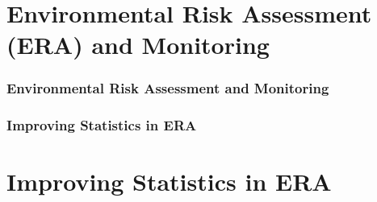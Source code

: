 \documentclass[
	12pt
	]{beamer}
\begin{document}
\section[Environmental Risk Assessment and Environmental Monitoring
]{Environmental Risk Assessment (ERA) and Monitoring}

\begingroup
\footnotesize %
\begin{frame}
\frametitle{Environmental Risk Assessment and Monitoring}
    \vspace*{5mm}
	\resizebox{1.1\textwidth}{!}{
		\hspace*{-20mm}
	}
\end{frame}


\begin{frame}[noframenumbering]
\frametitle{Improving Statistics in ERA}
    \vspace*{5mm}
	\resizebox{1.1\textwidth}{!}{
		\hspace*{-20mm}
	}
\end{frame}
\endgroup


\section{Improving Statistics in ERA}
\end{document}
